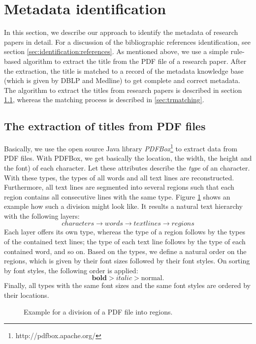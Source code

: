 \section{Metadata identification}\label{sec:extraction} 
In this section, we describe our approach to identify the metadata of research papers in detail. For a discussion of the bibliographic references identification, see section \ref{sec:identification:references}. As mentioned above, we use a simple rule-based algorithm to extract the title from the PDF file of a research paper. After the extraction, the title is matched to a record of the metadata knowledge base (which is given by DBLP and Medline) to get complete and correct metadata. The algorithm to extract the titles from research papers is described in section \ref{sec:trextraction}, whereas the matching process is described in \ref{sec:trmatching}.

\subsection{The extraction of titles from PDF files}\label{sec:trextraction}
Basically, we use the open source Java library \textit{PDFBox}\footnote{http://pdfbox.apache.org/} to extract data from PDF files. With PDFBox, we get basically the location, the width, the height and the font) of each character. Let these attributes describe the \textit{type} of an character. With these types, the types of all words and all text lines are reconstructed. Furthermore, all text lines are segmented into several regions such that each region contains all consecutive lines with the same type. Figure \ref{fig:division_regions} shows an example how such a division might look like. It results a natural text hierarchy with the following layers: 
$$ characters \rightarrow words \rightarrow text lines \rightarrow regions $$
Each layer offers its own type, whereas the type of a region follows by the types of the contained text lines; the type of each text line follows by the type of each contained word, and so on. Based on the types, we define a natural order on the regions, which is given by their font sizes followed by their font styles. On sorting by font styles, the following order is applied: $$\textbf{bold} > \textit{italic} > \text{normal}.$$
Finally, all types with the same font sizes and the same font styles are ordered by their locations.

\begin{figure}
\centering
{}      
\caption{Example for a division of a PDF file into regions.}
\label{fig:division_regions}
\end{figure}

